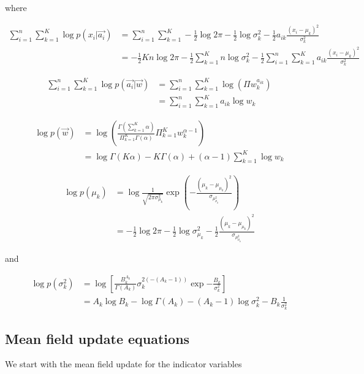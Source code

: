 \documentclass{amsart}
\def \half {\frac{1}{2}}
\begin{document}
where

\begin{align*}
\sum_{i=1}^n \sum_{k=1}^K \log{p(x_i|\vec{a_i})} &= \sum_{i=1}^n \sum_{k=1}^K - \half \log{2 \pi} - \half \log{\sigma_k^2} - \half a_{ik} \frac{(x_i - \mu_k)^2}{\sigma_k^2} \\
&= - \half Kn \log{2 \pi} - \half \sum_{k=1}^K n \log{\sigma_k^2} - \half \sum_{i=1}^n \sum_{k=1}^K a_{ik} \frac{(x_i - \mu_k)^2}{\sigma_k^2}
\end{align*}

\begin{align*}
\sum_{i=1}^n \sum_{k=1}^K \log{p(\vec{a_i}|\vec{w})} &= \sum_{i=1}^n \sum_{k=1}^K \log{(\Pi w_k^{a_{ik}})} \\
&= \sum_{i=1}^n \sum_{k=1}^K a_{ik} \log{w_k}
\end{align*}

\begin{align*}
\log{p(\vec{w})} &= \log{\left( \frac{\Gamma(\sum_{k=1}^K \alpha)}{\Pi_{k=1}^K \Gamma(\alpha)} \Pi_{k=1}^K w_k^{\alpha-1} \right)} \\
&= \log \Gamma(K \alpha) - K \Gamma(\alpha) + (\alpha - 1) \sum_{k=1}^K \log{w_k}
\end{align*}

\begin{align*}
\log{p(\mu_k)} &= \log{ \frac{1}{\sqrt{2 \pi \sigma_{\mu_k}^2}} \exp{\left( -\frac{(\mu_k - \mu_{\mu_k})^2}{\sigma_{\mu_{\mu_k}^2}} \right)}} \\
&= -\half \log{2 \pi} - \half \log{\sigma_{\mu_k}^2} - \half \frac{(\mu_k - \mu_{\mu_k})^2}{\sigma_{\mu_{\mu_k}^2}}
\end{align*}

and

\begin{align*}
\log{p(\sigma_k^2)} &= \log{\left [ \frac{B_k^{A_k}}{\Gamma(A_k)} \sigma_k^{2 (-(A_k - 1))} \exp{-\frac{B_k}{\sigma_k^2}} \right ]} \\
&= A_k \log{B_k} - \log{\Gamma(A_k)} - (A_k - 1) \log{\sigma_k^2} - B_k \frac{1}{\sigma_k^2}
\end{align*}

\subsection{Mean field update equations}

We start with the mean field update for the indicator variables
\end{document}
